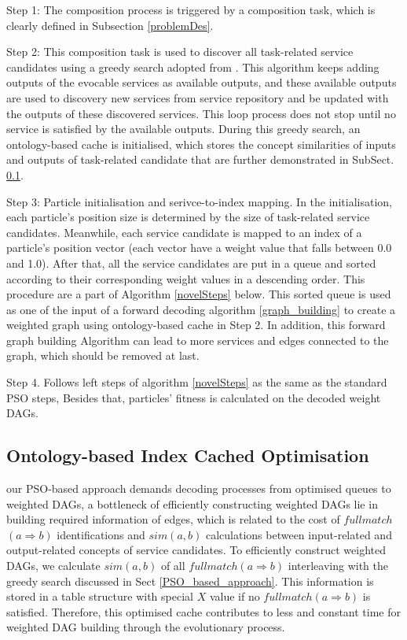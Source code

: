 \documentclass{llncs}
\begin{document}
Step 1: The composition process is triggered by a composition task, which is clearly defined in Subsection \ref{problemDes}.

Step 2: This composition task is used to discover all task-related service candidates using a greedy search adopted from \cite{ma2015hybrid}. This algorithm keeps adding outputs of the evocable services as available outputs, and these available outputs are used to discovery new services from service repository and be updated with the outputs of these discovered services. This loop process does not stop until no service is satisfied by the available outputs. During this greedy search, an ontology-based cache is initialised, which stores the concept similarities of inputs and outputs of task-related candidate that are further demonstrated in SubSect. \ref{indexCache}. 

Step 3: Particle initialisation and serivce-to-index mapping. In the initialisation, each particle's position size is determined by the size of task-related service candidates. Meanwhile, each service candidate is mapped to an index of a particle’s position vector (each vector have a weight value that falls between 0.0 and 1.0). After that, all the service candidates are put in a queue and sorted according to their corresponding weight values in a descending order. This procedure are a part of  Algorithm \ref{novelSteps} below. This sorted queue is used as one of the input of a forward decoding algorithm \ref{graph_building} to create a weighted graph using ontology-based cache in Step 2. In addition, this forward graph building Algorithm can lead to more services and edges connected to the graph, which should be removed at last.


Step 4. Follows left steps of algorithm \ref{novelSteps} as the same as the standard PSO steps, Besides that, particles' fitness is calculated on the decoded weight DAGs. 



\subsection{Ontology-based Index Cached Optimisation}\label{indexCache}
our PSO-based approach demands decoding processes from optimised queues to weighted DAGs, a bottleneck of efficiently constructing weighted DAGs lie in building required information of edges, which is related to the cost of $fullmatch$
$(a \Rightarrow b)$ identifications and $sim(a, b)$ calculations between input-related and output-related concepts of service candidates. To efficiently construct weighted DAGs, we calculate $sim(a, b)$ of all $fullmatch(a \Rightarrow b)$ interleaving with the greedy search discussed in Sect \ref{PSO_based_approach}. This information is stored in a table structure with special $X$ value if no $fullmatch(a \Rightarrow b)$ is satisfied. Therefore, this optimised cache contributes to less and constant time for weighted DAG building through the evolutionary process.
\end{document}

